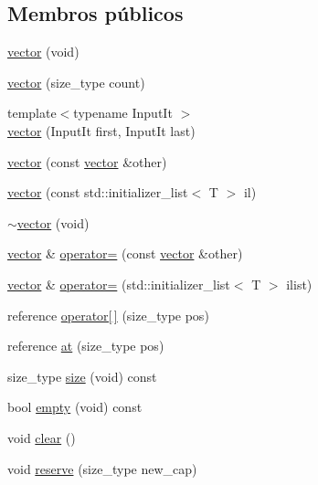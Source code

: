\subsection*{Membros públicos}
\begin{DoxyCompactItemize}
\item 
\mbox{\hyperlink{classsc_1_1vector_a8bdd977a270969ddd857da2bb43bd3ca}{vector}} (void)
\item 
\mbox{\hyperlink{classsc_1_1vector_a641fcc38459aee8e3bdf86abb5f9d193}{vector}} (size\+\_\+type count)
\item 
{\footnotesize template$<$typename Input\+It $>$ }\\\mbox{\hyperlink{classsc_1_1vector_ab58c55200c6a120b9d24793a271512fb}{vector}} (Input\+It first, Input\+It last)
\item 
\mbox{\hyperlink{classsc_1_1vector_aed6fb1e650e0256b483ce754a473c4c2}{vector}} (const \mbox{\hyperlink{classsc_1_1vector}{vector}} \&other)
\item 
\mbox{\hyperlink{classsc_1_1vector_afabfa0d0a4c92d9b8d358821de73de3f}{vector}} (const std\+::initializer\+\_\+list$<$ T $>$ il)
\item 
\mbox{\hyperlink{classsc_1_1vector_a2360fd6b0e63319e12d30ebc4c8330ab}{$\sim$vector}} (void)
\item 
\mbox{\hyperlink{classsc_1_1vector}{vector}} \& \mbox{\hyperlink{classsc_1_1vector_acb19d7e567b317cb9e9f20b68b923ff9}{operator=}} (const \mbox{\hyperlink{classsc_1_1vector}{vector}} \&other)
\item 
\mbox{\hyperlink{classsc_1_1vector}{vector}} \& \mbox{\hyperlink{classsc_1_1vector_ac06042d1df3ec08ca421c33205a0a62b}{operator=}} (std\+::initializer\+\_\+list$<$ T $>$ ilist)
\item 
reference \mbox{\hyperlink{classsc_1_1vector_a6aa5376ac0bca60a4ef154095733591c}{operator\mbox{[}$\,$\mbox{]}}} (size\+\_\+type pos)
\item 
reference \mbox{\hyperlink{classsc_1_1vector_ade22050951b0a2b13211efd3ba57e7f2}{at}} (size\+\_\+type pos)
\item 
size\+\_\+type \mbox{\hyperlink{classsc_1_1vector_afee521145d4c91a523a4ab3c605296a2}{size}} (void) const
\item 
bool \mbox{\hyperlink{classsc_1_1vector_ae189cd89e598a752b891e55869694f17}{empty}} (void) const
\item 
void \mbox{\hyperlink{classsc_1_1vector_a8fe7985eb59c7ce5c1165184feebc939}{clear}} ()
\item 
void \mbox{\hyperlink{classsc_1_1vector_ab3f182ffcff81ba14ecfcc9e53711496}{reserve}} (size\+\_\+type new\+\_\+cap)

\end{DoxyCompactItemize}
